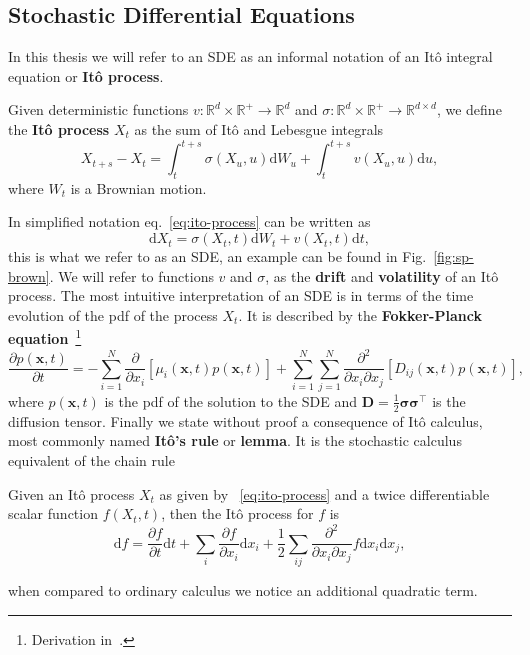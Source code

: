 \subsection{Stochastic Differential Equations}
In this thesis we will refer to an SDE as an informal notation of an It\^ o integral equation or \textbf{It\^ o process}. 
\begin{definition}[It\^ o process]
	Given deterministic functions $v: \mathbb{R}^{d} \times \mathbb{R}^{+} \rightarrow \mathbb{R}^{d}$ and $\sigma: \mathbb{R}^{d} \times \mathbb{R}^{+} \rightarrow \mathbb{R}^{d \times d}$, we define the \textbf{It\^ o process} $X_t$ as the sum of It\^ o and Lebesgue integrals
	\begin{equation}
		\label{eq:ito-process}
		X_{t+s}-X_{t}=\int_{t}^{t+s} \sigma\left(X_{u}, u\right) \mathrm{d} W_{u} + \int_{t}^{t+s} v\left(X_{u}, u\right) \mathrm{d} u,
	\end{equation}
	where $W_t$ is a Brownian motion.
\end{definition}
In simplified notation eq.~\eqref{eq:ito-process} can be written as
\begin{equation}
	\label{eq:SDE_general}
	\mathrm{d} X_t = \sigma \left(X_{t}, t\right)\mathrm{d}W_t + v\left(X_{t}, t\right) \mathrm{d}t,
\end{equation}
this is what we refer to as an SDE, an example can be found in Fig.~\ref{fig:sp-brown}. We will refer to functions $v$ and $\sigma$, as the \textbf{drift} and \textbf{volatility} of an It\^ o process. The most intuitive interpretation of an SDE is in terms of the time evolution of the pdf of the process $X_t$. It is described by the \textbf{Fokker-Planck equation}~\footnote{Derivation in~\cite{sarkka2019applied}.} 
\begin{equation}
	\label{eq:Fokker-Planck-General}
	\frac{\partial p(\mathbf{x}, t)}{\partial t}=
	-\sum_{i=1}^{N} \frac{\partial}{\partial x_{i}}\left[\mu_{i}(\mathbf{x}, t) p(\mathbf{x}, t)\right]
	+\sum_{i=1}^{N} \sum_{j=1}^{N} \frac{\partial^{2}}{\partial x_{i} \partial x_{j}}\left[D_{i j}(\mathbf{x}, t) p(\mathbf{x}, t)\right],
\end{equation}
where $p(\mathbf{x}, t)$ is the pdf of the solution to the SDE and $\mathbf{D}=\frac{1}{2} \boldsymbol{\sigma} \boldsymbol{\sigma}^{\top}$ is the diffusion tensor. Finally we state without proof a consequence of It\^ o calculus, most commonly named \textbf{It\^ o's rule} or \textbf{lemma}. It is the stochastic calculus equivalent of the chain rule
\begin{lemma}[It\^ o's lemma]
	Given an It\^ o process $X_t$ as given by ~\eqref{eq:ito-process} and a twice differentiable scalar function $f(X_t, t)$, then the It\^ o process for $f$ is
	\begin{equation}
		\label{eq:ito_lemma}
		\mathrm{d} f = \frac{\partial f}{\partial t}\mathrm{d}t + \sum_i \frac{\partial f}{\partial x_i} \mathrm{d}x_i + \frac{1}{2}\sum_{ij} \frac{\partial^{2}}{\partial x_{i} \partial x_{j}} f \mathrm{d}x_i \mathrm{d}x_j,
	\end{equation}
\end{lemma}
when compared to ordinary calculus we notice an additional quadratic term.

